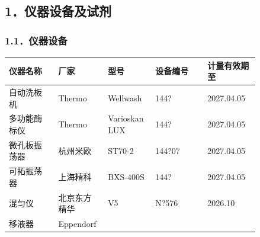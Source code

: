 \documentclass[UTF8,10pt,a4paper,fontset=fandol]{ctexart}
\newcommand{\fieldvalue}[1]{#1}
\newcommand{\handwritten}[1]{#1}
\begin{document}
\subsection{1．仪器设备及试剂}

\subsubsection{1.1．仪器设备}

\begin{center}
\small
\begin{tabular}{|p{0.18\linewidth}|p{0.14\linewidth}|p{0.14\linewidth}|p{0.19\linewidth}|p{0.19\linewidth}|}
\hline
仪器名称 & 厂家 & 型号 & 设备编号 & 计量有效期至 \\
\hline
自动洗板机 & Thermo & Wellwash &
\fieldvalue{\handwritten{144?}} &
\fieldvalue{\handwritten{2027.04.05}} \\
\hline
多功能酶标仪 & Thermo & Varioskan LUX &
\fieldvalue{\handwritten{144?}} &
\fieldvalue{\handwritten{2027.04.05}} \\
\hline
微孔板振荡器 & 杭州米欧 & ST70-2 &
\fieldvalue{\handwritten{144?07}} &
\fieldvalue{\handwritten{2027.04.05}} \\
\hline
可拓振荡器 & 上海精科 & BXS-400S &
\fieldvalue{\handwritten{144?}} &
\fieldvalue{\handwritten{2027.04.05}} \\
\hline
混匀仪 & 北京东方精华 & V5 &
\fieldvalue{\handwritten{N?576}} &
\fieldvalue{\handwritten{2026.10}} \\
\hline
移液器 & Eppendorf & &

\end{tabular}
\end{center}
\end{document}
